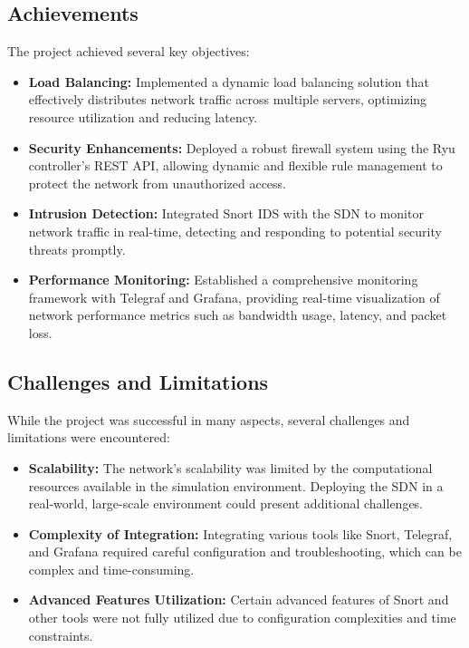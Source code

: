 \documentclass[a4paper,12pt]{article}
\begin{document}
\subsection{Achievements}

The project achieved several key objectives:
\begin{itemize}
    \item \textbf{Load Balancing:} Implemented a dynamic load balancing solution that effectively distributes network traffic across multiple servers, optimizing resource utilization and reducing latency.
    \item \textbf{Security Enhancements:} Deployed a robust firewall system using the Ryu controller's REST API, allowing dynamic and flexible rule management to protect the network from unauthorized access.
    \item \textbf{Intrusion Detection:} Integrated Snort IDS with the SDN to monitor network traffic in real-time, detecting and responding to potential security threats promptly.
    \item \textbf{Performance Monitoring:} Established a comprehensive monitoring framework with Telegraf and Grafana, providing real-time visualization of network performance metrics such as bandwidth usage, latency, and packet loss.
\end{itemize}

\subsection{Challenges and Limitations}

While the project was successful in many aspects, several challenges and limitations were encountered:
\begin{itemize}
    \item \textbf{Scalability:} The network's scalability was limited by the computational resources available in the simulation environment. Deploying the SDN in a real-world, large-scale environment could present additional challenges.
    \item \textbf{Complexity of Integration:} Integrating various tools like Snort, Telegraf, and Grafana required careful configuration and troubleshooting, which can be complex and time-consuming.
    \item \textbf{Advanced Features Utilization:} Certain advanced features of Snort and other tools were not fully utilized due to configuration complexities and time constraints.
\end{itemize}
\end{document}
